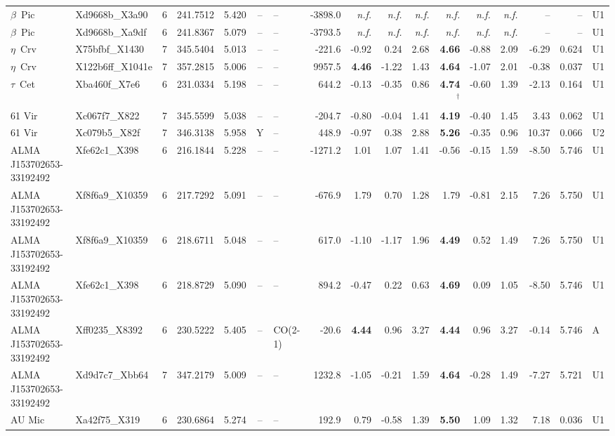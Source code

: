 \begin{tabular}{@{}l@{~}l@{~}c@{~}r@{~}r@{~}c@{~}l@{~}r@{~~}r@{~}r@{~}r@{~~}r@{~}r@{~}r@{~~}r@{~}r@{~}l@{}}
$\beta$~Pic & Xd9668b\_X3a90 & 6 & 241.7512 & 5.420 & -- & -- & -3898.0 & \emph{n.f.} & \emph{n.f.} & \emph{n.f.} & \emph{n.f.} & \emph{n.f.} & \emph{n.f.} & -- & -- & U1 \\
$\beta$~Pic & Xd9668b\_Xa9df & 6 & 241.8367 & 5.079 & -- & -- & -3793.5 & \emph{n.f.} & \emph{n.f.} & \emph{n.f.} & \emph{n.f.} & \emph{n.f.} & \emph{n.f.} & -- & -- & U1 \\
$\eta$~Crv & X75bfbf\_X1430 & 7 & 345.5404 & 5.013 & -- & -- & -221.6 & -0.92 & 0.24 & 2.68 & \textbf{4.66} & -0.88 & 2.09 & -6.29 & 0.624 & U1 \\
$\eta$~Crv & X122b6ff\_X1041e & 7 & 357.2815 & 5.006 & -- & -- & 9957.5 & \textbf{4.46} & -1.22 & 1.43 & \textbf{4.64} & -1.07 & 2.01 & -0.38 & 0.037 & U1 \\
$\tau$~Cet & Xba460f\_X7e6 & 6 & 231.0334 & 5.198 & -- & -- & 644.2 & -0.13 & -0.35 & 0.86 & \textbf{4.74}$^{\dagger}$ & -0.60 & 1.39 & -2.13 & 0.164 & U1 \\
61 Vir & Xc067f7\_X822 & 7 & 345.5599 & 5.038 & -- & -- & -204.7 & -0.80 & -0.04 & 1.41 & \textbf{4.19} & -0.40 & 1.45 & 3.43 & 0.062 & U1 \\
61 Vir & Xc079b5\_X82f & 7 & 346.3138 & 5.958 & Y & -- & 448.9 & -0.97 & 0.38 & 2.88 & \textbf{5.26} & -0.35 & 0.96 & 10.37 & 0.066 & U2 \\
ALMA J153702653-33192492 & Xfe62c1\_X398 & 6 & 216.1844 & 5.228 & -- & -- & -1271.2 & 1.01 & 1.07 & 1.41 & -0.56 & -0.15 & 1.59 & -8.50 & 5.746 & U1 \\
ALMA J153702653-33192492 & Xf8f6a9\_X10359 & 6 & 217.7292 & 5.091 & -- & -- & -676.9 & 1.79 & 0.70 & 1.28 & 1.79 & -0.81 & 2.15 & 7.26 & 5.750 & U1 \\
ALMA J153702653-33192492 & Xf8f6a9\_X10359 & 6 & 218.6711 & 5.048 & -- & -- & 617.0 & -1.10 & -1.17 & 1.96 & \textbf{4.49} & 0.52 & 1.49 & 7.26 & 5.750 & U1 \\
ALMA J153702653-33192492 & Xfe62c1\_X398 & 6 & 218.8729 & 5.090 & -- & -- & 894.2 & -0.47 & 0.22 & 0.63 & \textbf{4.69} & 0.09 & 1.05 & -8.50 & 5.746 & U1 \\
ALMA J153702653-33192492 & Xff0235\_X8392 & 6 & 230.5222 & 5.405 & -- & CO(2-1) & -20.6 & \textbf{4.44} & 0.96 & 3.27 & \textbf{4.44} & 0.96 & 3.27 & -0.14 & 5.746 & A \\
ALMA J153702653-33192492 & Xd9d7c7\_Xbb64 & 7 & 347.2179 & 5.009 & -- & -- & 1232.8 & -1.05 & -0.21 & 1.59 & \textbf{4.64} & -0.28 & 1.49 & -7.27 & 5.721 & U1 \\
AU Mic & Xa42f75\_X319 & 6 & 230.6864 & 5.274 & -- & -- & 192.9 & 0.79 & -0.58 & 1.39 & \textbf{5.50} & 1.09 & 1.32 & 7.18 & 0.036 & U1 \\

\end{tabular}
